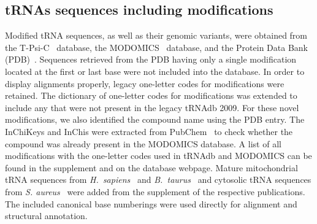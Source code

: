 \documentclass[unnumsec,webpdf,contemporary,large]{oup-authoring-template}
\newcommand{\TODO}[1]{\begingroup\color{red}#1\endgroup}
\begin{document}
\subsection{tRNAs sequences including modifications}\label{subsecmodifiedtRNA}
Modified tRNA sequences, as well as their genomic variants, were obtained
from the \TODO{T-Psi-C~\cite{tpsic} database, the MODOMICS~\cite{modomics} database,} and the Protein Data Bank
(PDB)~\cite{pdb2000}.  Sequences retrieved from the PDB having only a
single modification located at the first or last base were not included
into the database.  In order to display alignments properly, legacy
one-letter codes for modifications were retained.  The dictionary of
one-letter codes for modifications was extended to include any that were
not present in the legacy tRNAdb 2009.  For these novel modifications, we
also identified the compound name using the PDB entry. The InChiKeys and
InChis were extracted from PubChem~\cite{pubchem2025} to check whether the
compound was already present in the MODOMICS database. A list of all
modifications with the one-letter codes used in tRNAdb and MODOMICS can be
found in the supplement and on the database webpage.  Mature mitochondrial
tRNA sequences from \emph{H.\ sapiens}~\cite{humanmtRNA} and \emph{B.\
  taurus}~\cite{modtRNAbtaurus} \TODO{and cytosolic tRNA sequences from \emph{S. aureus}~\cite{Saureus}} were added from the supplement of the
respective publications. The included canonical base numberings were used
directly for alignment and structural annotation.
\end{document}
